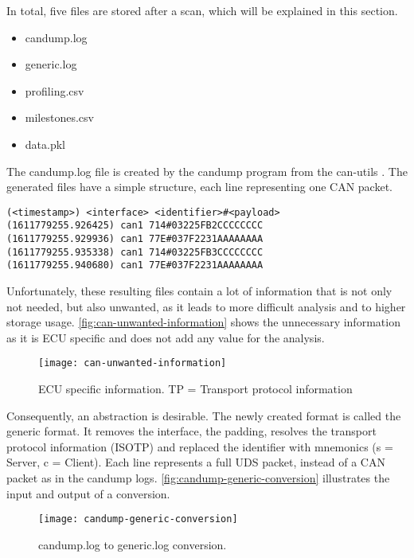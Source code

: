 In total, five files are stored after a scan, which will be explained in this section.

\begin{itemize}
    \item candump.log
    \item generic.log
    \item profiling.csv
    \item milestones.csv
    \item data.pkl
\end{itemize}

The candump.log file is created by the candump program from the can-utils \cite{can-utils}. The generated files have a simple structure, each line representing one CAN packet.

\begin{samepage}
\begin{verbatim}
(<timestamp>) <interface> <identifier>#<payload>
(1611779255.926425) can1 714#03225FB2CCCCCCCC
(1611779255.929936) can1 77E#037F2231AAAAAAAA
(1611779255.935338) can1 714#03225FB3CCCCCCCC
(1611779255.940680) can1 77E#037F2231AAAAAAAA
\end{verbatim}
\end{samepage}

Unfortunately, these resulting files contain a lot of information that is not only not needed, but also unwanted, as it leads to more difficult analysis and to higher storage usage. \autoref{fig:can-unwanted-information} shows the unnecessary information as it is ECU specific and does not add any value for the analysis.

\begin{figure}[h]
    \centering
    \texttt{[image: can-unwanted-information]}
    \caption{ECU specific information. TP = Transport protocol information}
    \label{fig:can-unwanted-information}
\end{figure}

Consequently, an abstraction is desirable. The newly created format is called the generic format. It removes the interface, the padding, resolves the transport protocol information (ISOTP) and replaced the identifier with mnemonics (s = Server, c = Client). Each line represents a full UDS packet, instead of a CAN packet as in the candump logs. \autoref{fig:candump-generic-conversion} illustrates the input and output of a conversion.

\begin{figure}[h]
    \centering
    \texttt{[image: candump-generic-conversion]}
    \caption{candump.log to generic.log conversion.}
    \label{fig:candump-generic-conversion}
\end{figure}


